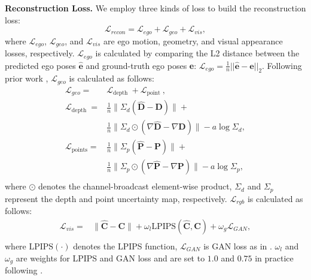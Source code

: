 \noindent\textbf{Reconstruction Loss. }
We employ three kinds of loss to build the reconstruction loss:
\begin{equation}
   \mathcal{L}_{recon} = \mathcal{L}_{ego} + \mathcal{L}_{geo} + \mathcal{L}_{vis},
\end{equation}
\noindent where $\mathcal{L}_{ego}$, $\mathcal{L}_{geo}$, and $\mathcal{L}_{vis}$ are ego motion, geometry, and visual appearance losses, respectively. $\mathcal{L}_{ego}$ is calculated by comparing the L2 distance between the predicted ego poses $\hat{\textbf{e}}$ and ground-truth ego poses \textbf{e}: $\mathcal{L}_{ego} = \frac{1}{n}||\hat{\textbf{e}} - \textbf{e}||_2$. Following prior work \cite{vggt}, $\mathcal{L}_{geo}$ is calculated as follows:
\begin{equation}
\begin{aligned}
    \mathcal{L}_{geo} =& \mathcal{L}_{\text {depth }}  + \mathcal{L}_{\text {point }},\\
    \mathcal{L}_{\text {depth }} =&\frac{1}{n} \| \Sigma_{d} \left(\hat{\textbf{D}}-\textbf{D}\right)\|+ \\ &\frac{1}{n}\|\Sigma_{d} \odot\left(\nabla \hat{\textbf{D}}-\nabla \textbf{D}\right) \|-a \log \Sigma_{d},\\
    \mathcal{L}_{\text {points}} =&\frac{1}{n} \| \Sigma_{p} \left(\hat{\textbf{P}}-\textbf{P}\right)\|+ \\ &\frac{1}{n}\|\Sigma_{p} \odot\left(\nabla \hat{\textbf{P}}-\nabla \textbf{P}\right) \|- a \log \Sigma_{p},\\
\end{aligned}
\end{equation}
\noindent where $\odot$ denotes the channel-broadcast element-wise product, $\Sigma_{d}$ and $\Sigma_{p}$ represent the depth and point uncertainty map, respectively. $\mathcal{L}_{rgb}$ is calculated as follows:
\begin{equation}
\begin{aligned}
    \mathcal{L}_{vis} =& \|\hat{\textbf{C}} - \textbf{C}\|  + \omega_{l}\text{LPIPS}(\hat{\textbf{C}}, \textbf{C}) + \omega_{g} \mathcal{L}_{GAN},\\
\end{aligned}
\end{equation}
\noindent where $\text{LPIPS}(\cdot)$ denotes the LPIPS \cite{lpips} function, $\mathcal{L}_{GAN}$ is GAN loss as in \cite{gan_loss, rae}. $\omega_l$ and $\omega_g$ are weights for LPIPS and GAN loss and are set to $1.0$ and $0.75$ in practice following \cite{rae}.


